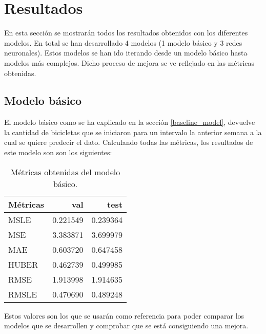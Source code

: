 \section{Resultados}\label{results}

En esta sección se mostrarán todos los resultados obtenidos con los diferentes modelos. En total se han desarrollado 4 modelos (1 modelo básico y 3 redes neuronales). Estos modelos se han ido iterando desde un modelo básico hasta modelos más complejos. Dicho proceso de mejora se ve reflejado en las métricas obtenidas.




\subsection{Modelo básico}
El modelo básico como se ha explicado en la sección \ref{baseline_model}, devuelve la cantidad de bicicletas que se iniciaron para un intervalo la anterior semana a la cual se quiere predecir el dato. Calculando todas las métricas, los resultados de este modelo son son los siguientes:

\begin{table}[H]
    \centering
    \begin{tabular}{l|rr}
    \toprule
    Métricas &      val &      test \\
    \midrule
    MSLE &  0.221549 &  0.239364 \\
    MSE &  3.383871 &  3.699979 \\
    MAE &  0.603720 &  0.647458 \\
    HUBER &  0.462739 &  0.499985 \\
    RMSE &  1.913998 &  1.914635 \\
    RMSLE &  0.470690 &  0.489248 \\
    \bottomrule
    \end{tabular}
    \caption{Métricas obtenidas del modelo básico.}
\end{table}

Estos valores son los que se usarán como referencia para poder comparar los modelos que se desarrollen y comprobar que se está consiguiendo una mejora.




